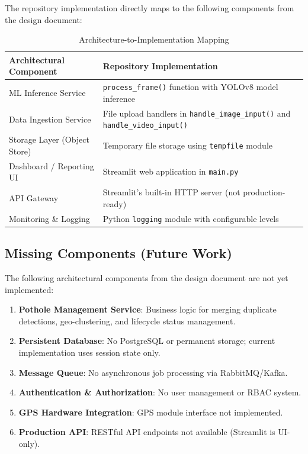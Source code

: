 \documentclass[12pt]{article}
\begin{document}
The repository implementation directly maps to the following components from the design document:

\begin{table}[H]
    \centering
    \caption{Architecture-to-Implementation Mapping}
    \label{tab:arch-mapping}
    \begin{tabular}{p{}p{}}
        \toprule
        \textbf{Architectural Component} & \textbf{Repository Implementation} \\
        \midrule
        ML Inference Service & \texttt{process\_frame()} function with YOLOv8 model inference \\
        Data Ingestion Service & File upload handlers in \texttt{handle\_image\_input()} and \texttt{handle\_video\_input()} \\
        Storage Layer (Object Store) & Temporary file storage using \texttt{tempfile} module \\
        Dashboard / Reporting UI & Streamlit web application in \texttt{main.py} \\
        API Gateway & Streamlit's built-in HTTP server (not production-ready) \\
        Monitoring \& Logging & Python \texttt{logging} module with configurable levels \\
        \bottomrule
    \end{tabular}
\end{table}

\subsection{Missing Components (Future Work)}

The following architectural components from the design document are not yet implemented:

\begin{enumerate}
    \item \textbf{Pothole Management Service}: Business logic for merging duplicate detections, geo-clustering, and lifecycle status management.
    \item \textbf{Persistent Database}: No PostgreSQL or permanent storage; current implementation uses session state only.
    \item \textbf{Message Queue}: No asynchronous job processing via RabbitMQ/Kafka.
    \item \textbf{Authentication \& Authorization}: No user management or RBAC system.
    \item \textbf{GPS Hardware Integration}: GPS module interface not implemented.
    \item \textbf{Production API}: RESTful API endpoints not available (Streamlit is UI-only).
\end{enumerate}
\end{document}
